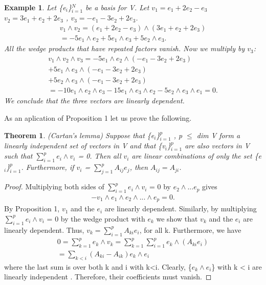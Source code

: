 \documentclass[12pt,a4paper]{article}
\newtheorem{thm}{Theorem}
\newtheorem{exmp}{Example}[section]
\begin{document}
\begin{exmp}
Let \{e$_i$\}$^N_{i=1}$ be a basis for V. Let $v_1 = e_1 + 2e_2 - e_3$ $v_2 = 3e_1 + e_2 + 2e_3$ , $v_3 = -e_1 - 3e_2 + 2 e_3$.
\begin{eqnarray*}
v_1 \wedge v_2 = ( e_1 + 2e_2 - e_3) \wedge (3e_1 + e_2 + 2e_3)\\
= -5e_1 \wedge e_2 + 5e_1 \wedge e_3 + 5 e_2 \wedge e_3.
\end{eqnarray*}	
All the wedge products that have repeated factors vanish. Now we multiply
by $v_3$: 
\begin{eqnarray*}
v_1 \wedge v_2 \wedge v_3 = -5e_1 \wedge e_2 \wedge ( -e_1 - 3e_2 + 2e_3) \\+ 5e_1 \wedge e_3 \wedge ( -e_1 -3e_2 + 2e_3)  \\+5e_2 \wedge
e_3 \wedge (-e_1 - 3e_2 + 2e_3)\\
= -10e_1 \wedge e_2 \wedge e_3 - 15e_1 \wedge e_3 \wedge e_2 - 5e_2 \wedge e_3 \wedge e_1 = 0.
\end{eqnarray*}
We conclude that the three vectors are linearly dependent.
\end{exmp}
As an aplication of Proposition 1 let us prove the following.
\begin{thm}
(Cartan’s lemma) Suppose that \{e$_i$\}$^p_{i=1}$ , p $\leq$ dim V form
a linearly independent set of vectors in V and that  \{v$_i$\}$^p_{i=1}$ are also vectors
in V such that $\sum^{p}_{i=1} e_i \wedge v_i$ = 0. Then all $v_i$ are linear combinations of only
the set \{e$_i$\}$^p_{i=1}$. Furthermore, if $v_i$ = $\sum^p_{j=1} A_{ij}e_{j}$, then $A_{ij} = A_{ji}$.
\end{thm}
\begin{proof}
Multiplying both sides of $\sum^{p}_{i=1} e_i \wedge v_i$ = 0 by $e_2 \wedge ... e_p$ gives
\begin{eqnarray*}
-v_1 \wedge e_1 \wedge e_2 \wedge ... \wedge e_p = 0.
\end{eqnarray*}
By Proposition 1, $v_1$ and the $e_i$ are linearly dependent. Similarly, by
multiplying $\sum^{p}_{i=1} e_i \wedge v_i$ = 0 by the wedge product with $e_k$  we
show that $v_k$ and  the $e_i$ are linearly dependent. Thus, $v_k = \sum^p_{i=1} A_{ki} e_i$, for all k. Furthermore, we have\\
\begin{eqnarray*}
 0 = \sum^{p}_{k=1} e_k \wedge v_k  = \sum^{p}_{k=1} \sum^{p}_{i=1} e_k \wedge ( A_{ki} e_i) \\= \sum_{k<i} (A_{ki} - A_{ik}) e_k \wedge e_i
\end{eqnarray*}
where the last sum is over both k and i with k<i. Clearly, \{$e_k \wedge e_i$\} with k <
i are linearly independent . Therefore, their coefficients must
vanish.
\end{proof}
\end{document}
